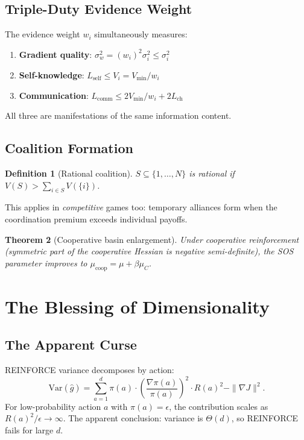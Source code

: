 \documentclass[11pt,a4paper]{article}
\newtheorem{theorem}{Theorem}[section]
\newtheorem{definition}[theorem]{Definition}
\newcommand{\norm}[1]{\|#1\|}
\begin{document}
\subsection{Triple-Duty Evidence Weight}

The evidence weight $w_i$ simultaneously measures:
\begin{enumerate}
    \item \textbf{Gradient quality}: $\sigma_w^2 = (w_i)^2 \sigma_i^2 \leq \sigma_i^2$
    \item \textbf{Self-knowledge}: $L_{\text{self}} \leq V_i = V_{\min}/w_i$
    \item \textbf{Communication}: $L_{\text{comm}} \leq 2V_{\min}/w_i + 2L_{\text{ch}}$
\end{enumerate}
All three are manifestations of the same information content.

\subsection{Coalition Formation}

\begin{definition}[Rational coalition]
$S \subseteq \{1,\ldots,N\}$ is rational if $V(S) > \sum_{i \in S} V(\{i\})$.
\end{definition}

This applies in \emph{competitive} games too: temporary alliances
form when the coordination premium exceeds individual payoffs.

\begin{theorem}[Cooperative basin enlargement]\label{thm:coop-basin}
Under cooperative reinforcement (symmetric part of the cooperative
Hessian is negative semi-definite), the SOS parameter improves to
$\mu_{\text{coop}} = \mu + \beta \mu_C$.
\end{theorem}


\section{The Blessing of Dimensionality}\label{sec:blessing}

\subsection{The Apparent Curse}

REINFORCE variance decomposes by action:
\begin{equation}
    \text{Var}(\hat{g}) = \sum_{a=1}^d \pi(a) \cdot
    \left(\frac{\nabla \pi(a)}{\pi(a)}\right)^2 \cdot R(a)^2
    - \norm{\nabla J}^2.
\end{equation}
For low-probability action $a$ with $\pi(a) = \epsilon$, the
contribution scales as $R(a)^2/\epsilon \to \infty$. The apparent
conclusion: variance is $\Theta(d)$, so REINFORCE fails for large $d$.
\end{document}
